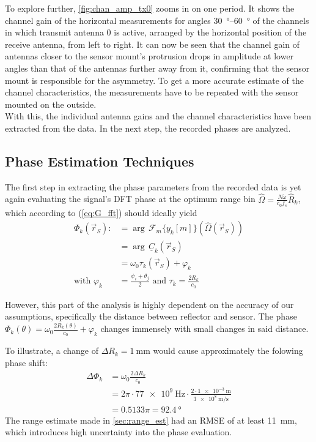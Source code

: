 To explore further, \cref{fig:chan_amp_tx0} zooms in on one period.
It shows the channel gain of the horizontal measurements for angles \SIrange{30}{60}{\degree}
of the channels in which transmit antenna 0 is active, arranged by the horizontal position of the receive antenna, from left to right.
It can now be seen that the channel gain of antennas closer to the sensor mount's protrusion drops
in amplitude at lower angles than that of the antennas further away from it,
confirming that the sensor mount is responsible for the asymmetry.
To get a more accurate estimate of the channel characteristics,
the measurements have to be repeated with the sensor mounted on the outside.\\

With this, the individual antenna gains and the channel characteristics have been extracted from the data.
In the next step, the recorded phases are analyzed. \\

\newpage
\subsection{Phase Estimation Techniques}

The first step in extracting the phase parameters from the recorded data is yet again
evaluating the signal's DFT phase at the optimum range bin $\hat \Omega = \frac{ N \dot \omega}{c_0 f_s}\hat R_k$,
which according to (\ref{eq:G_fft}) should ideally yield
\begin{align}
  \Phi_k(\vec r_S) :     & = \arg\, \mathcal{F}_m\{y_k[m]\} (\hat \Omega(\vec r_S)) \\
                         & =    \arg\,\underline C_k(\vec r_S)                      \\
                         & = \omega_0\tau_k(\vec r_S) + \varphi_k                   \\
  \text{with } \varphi_k & = \frac{\psi_{i}+\theta_{j}}{2}
  \text{ and } \tau_k    = \frac{2R_k}{c_0}
\end{align}

However, this part of the analysis is highly dependent on the accuracy of our assumptions,
specifically the distance between reflector and sensor.
The phase $\Phi_k(\theta) = \omega_0 \frac{2R_k(\theta)}{c_0} + \varphi_k$ changes immensely with small changes in said distance.

To illustrate, a change of $\Delta R_k = \SI{1}{\mm}$ would cause approximately the folowing phase shift:
\begin{align*}
  \Delta\Phi_k & = \omega_0 \frac{2\Delta R_k}{c_0}                                            \\
               & = 2\pi \cdot \SI{77e9}{\Hz} \cdot \frac{2\cdot\SI{1e-3}{\m}}{\SI{3e8}{\m/\s}} \\
               & = 0.5133 \pi = \SI{92.4}{\degree}
\end{align*}
The range estimate made in \cref{sec:range_est} had an RMSE of at least \SI{11}{\mm},
which introduces high uncertainty into the phase evaluation. \\

